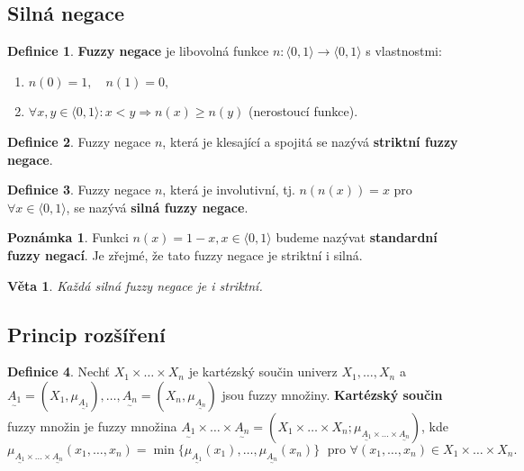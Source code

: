 \documentclass[a4]{report}
\newtheorem{theorem}{Věta}
\theoremstyle{definition}
\newtheorem{definition}{Definice}[section]
\newtheorem{remark}{Poznámka}[section]
\begin{document}
{\subsection{Silná negace}
\begin{definition}
\textbf{Fuzzy negace} je libovolná funkce $n:\langle 0,1\rangle \rightarrow \langle 0,1\rangle$ s vlastnostmi:
\begin{enumerate}
\item $n(0) = 1, \quad n(1) = 0,$
\item $\forall x,y \in \langle 0,1\rangle:  x<y \Rightarrow n(x) \geq n(y)$ (nerostoucí funkce). 
\end{enumerate}
\end{definition}

\begin{definition}
Fuzzy negace $n$, která je klesající a spojitá se nazývá \textbf{striktní fuzzy negace}.
\end{definition}

\begin{definition}
Fuzzy negace $n$, která je involutivní, tj. $n(n(x))=x$ pro $\forall x \in \langle 0,1\rangle$, se nazývá \textbf{silná fuzzy negace}.
\end{definition}

\begin{remark}
Funkci $n(x)=1-x, x \in \langle 0,1\rangle$ budeme nazývat \textbf{standardní fuzzy negací}. Je zřejmé, že tato fuzzy negace je striktní i silná.  
\end{remark}

\begin{theorem}
Každá silná fuzzy negace je i striktní.
\end{theorem}



\subsection{Princip rozšíření}

\begin{definition}
Nechť $X_1 \times \ldots \times X_n$ je kartézský součin univerz $X_1, \ldots, X_n$ a $\underset{^\sim}{A_1} = (X_1, \mu_{\underset{^\sim}{A_1}}), \ldots, \underset{^\sim}{A_n} = (X_n, \mu_{\underset{^\sim}{A_n}})$ jsou fuzzy množiny. \textbf{Kartézský součin} fuzzy množin je fuzzy množina $\underset{^\sim}{A_1} \times \ldots \times \underset{^\sim}{A_n} = (X_1 \times \ldots \times X_n; \mu_{\underset{^\sim}{A_1} \times \ldots \times \underset{^\sim}{A_n}})$, kde
\begin{equation*}
\mu_{\underset{^\sim}{A_1} \times \ldots \times \underset{^\sim}{A_n}}(x_1, \ldots, x_n) = \min\lbrace \mu_{\underset{^\sim}{A_1}}(x_1), \ldots, \mu_{\underset{^\sim}{A_n}}(x_n) \rbrace \; \text{ pro } \forall(x_1, \ldots, x_n) \in X_1 \times \ldots \times X_n.
\end{equation*}
\end{definition}

}
\end{document}

